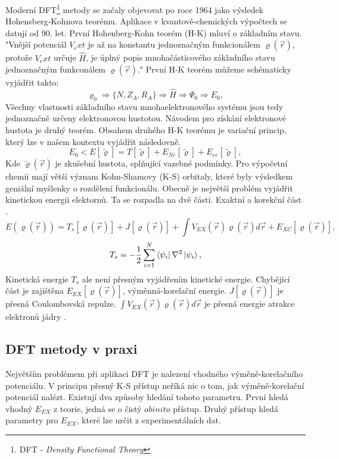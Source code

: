 \documentclass[
  digital, %
  table,   %
  lof,     %
  lot,     %
  oneside,
]{fithesis3}
\begin{document}
Moderní DFT\footnote{DFT - \textit{Density Functional Theory}} metody se začaly objevovat po roce 1964 jako výsledek Hohensberg-Kohnova teorému. Aplikace v kvantově-chemických výpočtech se datují od 90. let. První Hohenberg-Kohn teorém (H-K) mluví o základním stavu. "Vnější potenciál  $V_ext$ je až na konstantu jednoznačným funkcionálem $\varrho(\vec{r})$, protože $V_ext$ určuje $\widehat{H}$, je úplný popis mnohačásticového základního stavu jednoznačným funkconálem $\varrho(\vec{r})$."\cite{PhysRev.136.B864} První H-K teorém můžeme schématicky vyjádřit takto:
\begin{equation}
\varrho_0 \Rightarrow \{N, Z_A, R_A\} \Rightarrow \widehat{H} \Rightarrow \Psi_0 \Rightarrow E_0,
 \end{equation}
 Všechny vlastnosti základního stavu mnohaelektronového systému jsou tedy jednoznačně určeny elektronovou hustotou. Návodem pro získání elektronové hustota je druhý teorém. Obsahem druhého H-K teorému je variační princip, který lze v našem kontextu vyjádřit následovně.
\begin{equation}
E_0 < E [\tilde{\varrho}] = T[\tilde{\varrho}] + E_{Ne}[\tilde{\varrho}] + E_{ee}[\tilde{\varrho}],
\end{equation}
Kde $\tilde{\varrho}(\vec{r})$ je zkušební hustota, splňující vazebné podmínky. Pro výpočetní chemii mají větší význam Kohn-Shamovy (K-S) orbitaly, které byly výsledkem geniální myšlenky o rozdělení funkcionálu. Obecně je největší problém vyjádřit kinetickou energii elektornů. Ta se rozpadla na dvě části. Exaktní a korekční část  \cite{jensen2007introduction}\cite{koch2000chemist}.
\begin{equation}
E(\varrho(\vec{r})) = T_s[\varrho(\vec{r})] + J[\varrho(\vec{r})] + \int V_{EX}(\vec{r})\varrho(\vec{r})d\vec{r} + E_{XC}[\varrho(\vec{r})],
\end{equation}
 \begin{equation}
 T_s = -\frac{1}{2} \sum_{i=1}^{N}  \bra{\psi_i}{\nabla^{2}}\ket{\psi_i},
 \label{kineticka_energie_jednoelektronova}
 \end{equation}
 Kinetická energie $T_s$ ale není přesným vyjádřením kinetické energie. Chybějící část je zajištěna $E_{EX}[\varrho(\vec{r})]$, výměnná-korelační energie. $J[\varrho(\vec{r})]$ je přesná Coulombovská repulze. $\int V_{EX}(\vec{r})\varrho(\vec{r})d\vec{r}$ je přesná energie atrakce elektronů jádry \cite{parr1994density}.
\subsection{DFT metody v praxi}
Největším problémem při aplikaci DFT je nalezení vhodného výměně-korelačního potenciálu. V principu přesný K-S přístup neříká nic o tom, jak výměně-korelační potenciál nalézt. Existují dva způsoby hledání tohoto parametru. První hledá vhodný $E_{EX}$ z teorie, jedná se o čistý $ab inito$ přístup. Druhý přístup hledá parametry pro $E_{EX}$, které lze určit z experimentálních dat.
\end{document}
